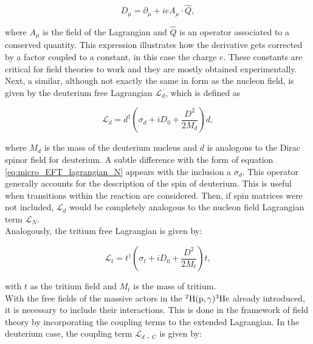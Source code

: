 \documentclass[openany]{book}
\begin{document}
\begin{equation}\label{eq:micro_EFT_covariantDerivative}
	D_\mu = \partial_\mu  + i e A_\mu \cdot \hat Q,
\end{equation}

where $A_\mu$ is the field of the Lagrangian and $\hat Q$ is an operator associated to a conserved quantity. This expression illustrates how the derivative gets corrected by a factor coupled to a constant, in this case the charge $e$. These constants are critical for field theories to work and they are mostly obtained experimentally. \\

Next, a similar, although not exactly the same in form as the nucleon field, is given by the deuterium free Lagrangian $\mathcal{L}_d$, which is defined as

\begin{equation}\label{eq:micro_EFT_lagrangian_d}
	\mathcal{L}_d  = d^{\dagger} \left( \sigma_d + i D_0 + \frac{D^2}{2M_d} \right) d,
\end{equation}

where $M_d$ is the mass of the deuterium nucleus and $d$ is analogous to the Dirac spinor field for deuterium. A subtle difference with the form of equation \ref{eq:micro_EFT_lagrangian_N} appears with the inclusion a $\sigma_d$. This operator generally accounts for the description of the spin of deuterium. This is useful when transitions within the reaction are considered. Then, if spin matrices were not included, $\mathcal{L}_d$ would be completely analogous to the nucleon field Lagrangian term $\mathcal{L}_N$.  \\

Analogously, the tritium free Lagrangian is given by: 

\begin{equation}\label{eq:micro_EFT_lagrangian_t}
	\mathcal{L}_t  = t^{\dagger} \left( \sigma_t + i D_0 + \frac{D^2}{2M_t} \right) t,
\end{equation}

with $t$ as the tritium field and $M_t$ is the mass of tritium.\\

With the free fields of the massive actors in the $\mathrm{{}^{2}H(p, \gamma){}^{3}He}$ already introduced, it is necessary to include their interactions. This is done in the framework of field theory by incorporating the coupling terms to the extended Lagrangian. In the deuterium case, the coupling term $	\mathcal{L}_{d-\mathrm{C}}$ is given by:
\end{document}
